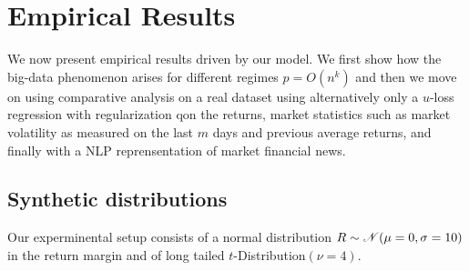 \section{Empirical Results}

We now present empirical results driven by our model. We first show how the big-data
phenomenon arises for different regimes $p=O(n^k)$ and then we move on using comparative
analysis on a real dataset using alternatively only a $u$-loss regression with
regularization qon the returns, market statistics such as market volatility as measured on
the last $m$ days and previous average returns, and finally with a NLP reprensentation of
market financial news.


\subsection{Synthetic distributions}

Our experminental setup consists of a normal distribution $R\sim\mathscr{N}(\mu=0,\sigma=10)$
in the return margin and of long tailed $t$-Distribution$(\nu=4)$.


